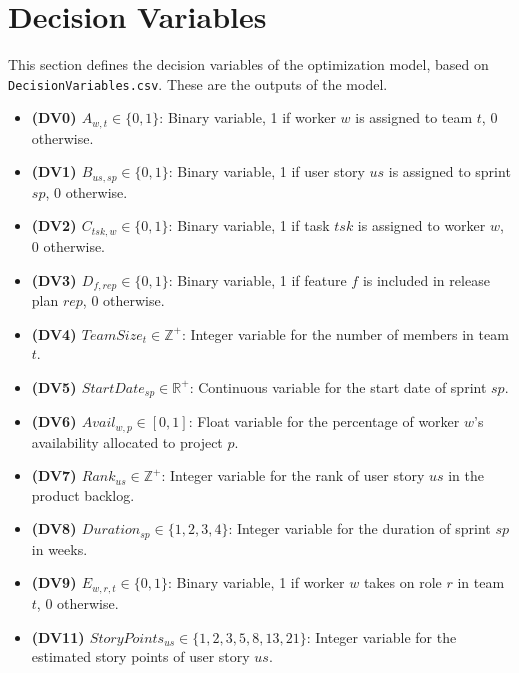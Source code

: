 \documentclass[11pt]{article}
\begin{document}
\section{Decision Variables}
This section defines the decision variables of the optimization model, based on \texttt{DecisionVariables.csv}. These are the outputs of the model.
\begin{itemize}
    \item \textbf{(DV0) $A_{w,t} \in \{0,1\}$}: Binary variable, 1 if worker $w$ is assigned to team $t$, 0 otherwise.
    \item \textbf{(DV1) $B_{us,sp} \in \{0,1\}$}: Binary variable, 1 if user story $us$ is assigned to sprint $sp$, 0 otherwise.
    \item \textbf{(DV2) $C_{tsk,w} \in \{0,1\}$}: Binary variable, 1 if task $tsk$ is assigned to worker $w$, 0 otherwise.
    \item \textbf{(DV3) $D_{f,rep} \in \{0,1\}$}: Binary variable, 1 if feature $f$ is included in release plan $rep$, 0 otherwise.
    \item \textbf{(DV4) $TeamSize_t \in \mathbb{Z}^+$}: Integer variable for the number of members in team $t$.
    \item \textbf{(DV5) $StartDate_{sp} \in \mathbb{R}^+$}: Continuous variable for the start date of sprint $sp$.
    \item \textbf{(DV6) $Avail_{w,p} \in [0,1]$}: Float variable for the percentage of worker $w$'s availability allocated to project $p$.
    \item \textbf{(DV7) $Rank_{us} \in \mathbb{Z}^+$}: Integer variable for the rank of user story $us$ in the product backlog.
    \item \textbf{(DV8) $Duration_{sp} \in \{1,2,3,4\}$}: Integer variable for the duration of sprint $sp$ in weeks.
    \item \textbf{(DV9) $E_{w,r,t} \in \{0,1\}$}: Binary variable, 1 if worker $w$ takes on role $r$ in team $t$, 0 otherwise.
    \item \textbf{(DV11) $StoryPoints_{us} \in \{1,2,3,5,8,13,21\}$}: Integer variable for the estimated story points of user story $us$.
\end{itemize}
\end{document}
